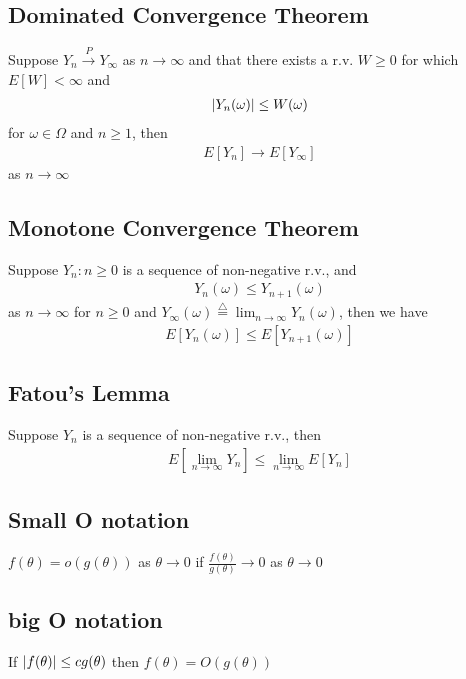 \subsection{Dominated Convergence Theorem}
Suppose $Y_n \overset{P}{\to} Y_\infty$ as $n \to \infty$ and that there exists a r.v. $W \geq 0$ for which $E[W] < \infty$ and 
    \begin{align*}
        \left| Y_n(\omega) \right| \leq W(\omega)
    \end{align*}
for $\omega \in \Omega$ and $n \geq 1$, then 
    \begin{align*}
        E[Y_n] \to E[Y_\infty] 
    \end{align*}
as $n \to \infty$


\subsection{Monotone Convergence Theorem}
Suppose $Y_n: n \geq 0$ is a sequence of non-negative r.v., and 
    \begin{align*}
        Y_{n}(\omega) \leq Y_{n+1} (\omega)
    \end{align*}
 as $n \to \infty$ for $n \geq 0$ and $Y_\infty(\omega) \overset{\triangle}{=} \lim_{n\to \infty} Y_n(\omega)$, then  we have 
    \begin{align*}
        E[Y_n(\omega)] \leq E[Y_{n+1}(\omega)]
    \end{align*}


\subsection{Fatou's Lemma}
Suppose $Y_n$ is a sequence of non-negative r.v., then 
    \begin{align*}
        E[\lim_{n \to \infty} Y_n] \leq \lim_{n \to \infty} E[Y_n]
    \end{align*}


\subsection{Small O notation}
$f(\theta) = o(g(\theta))$ as $\theta \to 0$ if $\frac{f(\theta)}{g(\theta)} \to 0$ as $\theta \to 0$

\subsection{big O notation}
If $\left| f(\theta) \right| \leq c g(\theta)$ then $f(\theta) = O(g(\theta))$


